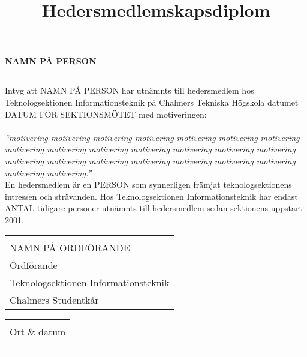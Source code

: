 \documentclass[11pt, noincludeaddress, nopagination]{classes/cthit}
\makeatletter
\newcommand{\sign}[4]{%
  \begin{tabular}[t]{@{}l@{}}
  \makebox[6.5cm]{\dotfill}\\
  \strut#1\strut \\
  \strut#2\strut \\
  \strut#3\strut \\
  \strut#4\strut \\
  \end{tabular}%
}
\makeatother
\begin{document}
\title{Hedersmedlemskapsdiplom}

\makeheadfoot%

\makesimpletitle
\begin{center}
\textbf{\Huge{NAMN PÅ PERSON}}
\end{center}
\vspace{1cm}
\subsection*{}
Intyg att NAMN PÅ PERSON har utnämnts till hedersmedlem hos Teknologsektionen Informationsteknik på Chalmers Tekniska Högskola datumet DATUM FÖR SEKTIONSMÖTET med motiveringen: 
\\
\\
\textit{
``motivering motivering motivering motivering motivering motivering motivering motivering motivering motivering motivering motivering motivering motivering motivering motivering motivering motivering motivering motivering motivering motivering motivering.''
}
\\

En hedersmedlem är en PERSON som synnerligen främjat teknologsektionens intressen och strävanden. Hos Teknologsektionen Informationsteknik har endast ANTAL tidigare personer utnämnts till hedersmedlem sedan sektionens uppstart 2001.

\vspace{4cm} 

\noindent
  \begin{minipage}[t]{0.5\linewidth}
    \raggedright
    \sign{NAMN PÅ ORDFÖRANDE}{Ordförande}{Teknologsektionen Informationsteknik}{Chalmers Studentkår}
  \end{minipage}%
  \hfill
  \begin{minipage}[t]{0.5\linewidth}
  \sign{Ort \& datum}{}{}{}
  \end{minipage}
\end{document}
